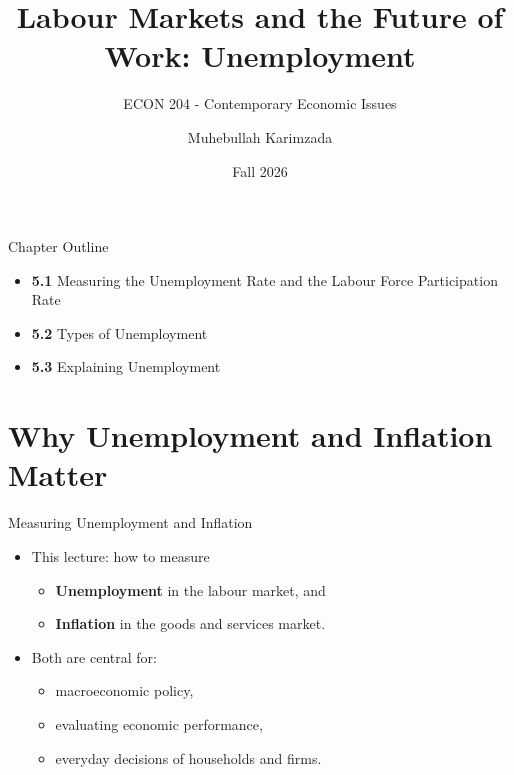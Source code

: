 \documentclass[aspectratio=169]{beamer}
\title{\textbf{Labour Markets and the Future of Work: Unemployment \vspace{.5cm}\\  }}
\subtitle{ {\large ECON 204 - Contemporary Economic Issues}}
\author{Muhebullah Karimzada}
\date{Fall 2026}
\begin{document}
\begin{frame}[plain]
  \titlepage
\end{frame}

\begin{frame}{Chapter Outline}
\transfade
\begin{itemize}
  \item \textbf{5.1} Measuring the Unemployment Rate and the Labour Force Participation Rate
  \item \textbf{5.2} Types of Unemployment
  \item \textbf{5.3} Explaining Unemployment

\end{itemize}
\end{frame}

\section*{Why Unemployment and Inflation Matter}

\begin{frame}{Measuring Unemployment and Inflation}
\transfade
\begin{itemize}

  \item This lecture: how to measure
  \begin{itemize}
    \item \textbf{Unemployment} in the labour market, and
    \item \textbf{Inflation} in the goods and services market.
  \end{itemize}
  \item Both are central for:
  \begin{itemize}
    \item macroeconomic policy,
    \item evaluating economic performance,
    \item everyday decisions of households and firms.
  \end{itemize}
\end{itemize}
\end{frame}

\end{document}
